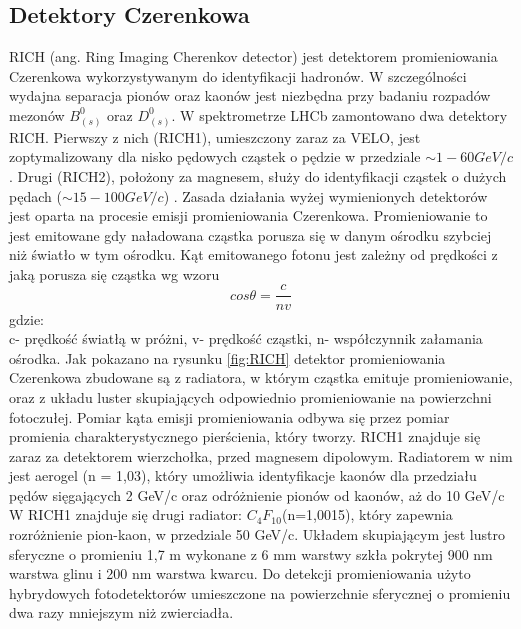 \subsection{Detektory Czerenkowa}
RICH (ang. Ring Imaging Cherenkov detector) jest detektorem promieniowania Czerenkowa wykorzystywanym do identyfikacji hadronów. W szczególności wydajna separacja pionów oraz kaonów jest niezbędna przy badaniu rozpadów mezonów $B_{(s)}^0$ oraz $D_{(s)}^0$. W spektrometrze LHCb zamontowano dwa detektory RICH. Pierwszy z nich (RICH1), umieszczony zaraz za VELO, jest zoptymalizowany dla nisko pędowych cząstek o pędzie w przedziale $\sim 1- 60 GeV/c$. Drugi (RICH2), położony za magnesem, służy do identyfikacji cząstek o dużych pędach ($\sim 15-100 GeV/c$) \cite{RICH}. Zasada działania wyżej wymienionych detektorów jest oparta na procesie emisji promieniowania Czerenkowa. Promieniowanie to jest emitowane gdy naładowana cząstka porusza się w danym ośrodku szybciej niż światło w tym ośrodku. Kąt emitowanego fotonu jest zależny od prędkości z jaką porusza się cząstka wg wzoru
\begin{equation}
 cos\theta=\frac{c}{n v}
\end{equation}
gdzie:\\
c- prędkość światłą w próżni, v- prędkość cząstki, n- współczynnik załamania ośrodka. Jak pokazano na rysunku \ref{fig:RICH} detektor promieniowania Czerenkowa zbudowane są z radiatora, w którym cząstka emituje promieniowanie, oraz z układu luster skupiających odpowiednio promieniowanie na powierzchni fotoczułej. Pomiar kąta emisji promieniowania odbywa się przez pomiar promienia charakterystycznego pierścienia, który tworzy.
RICH1 znajduje się zaraz za detektorem wierzchołka, przed magnesem dipolowym. Radiatorem w nim jest aerogel (n = 1,03), który umożliwia identyfikacje kaonów dla przedziału pędów sięgających 2 GeV/c oraz odróżnienie pionów od kaonów, aż do 10 GeV/c  W RICH1 znajduje się drugi radiator:  $C_4F_{10}$(n=1,0015), który zapewnia rozróżnienie pion-kaon, w przedziale  50 GeV/c. Układem skupiającym jest lustro sferyczne o promieniu 1,7 m wykonane z
6 mm warstwy szkła pokrytej 900 nm warstwa glinu i 200 nm warstwa kwarcu. Do detekcji promieniowania użyto hybrydowych fotodetektorów umieszczone na powierzchnie sferycznej o promieniu dwa razy mniejszym niż zwierciadła.



